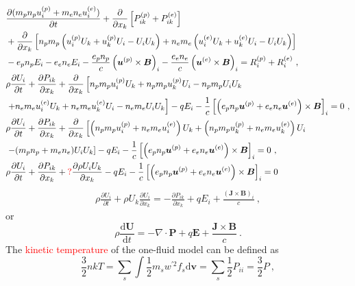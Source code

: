 \documentclass[12pt,a4paper]{article}
\renewcommand{\vec}[1]{\boldsymbol{#1}}
\newcommand{\dif}{\mathrm{d}}
\begin{document}
\begin{align*}
& \frac{\partial (m_p n_p u_i^{(p)} +m_e n_e u_i^{(e)})}{\partial t} +\frac{\partial }{\partial x_k} \left[P^{(p)}_{ik} +P^{(e)} _{ik} \right] \\
& +\frac{\partial }{\partial x_k} \left[n_p m_p \left(u_i^{(p)}U_k +u^{(p)}_{k} U_i -U_iU_k \right) +n_e m_e \left(u_i^{(e)}U_k +u^{(e)}_{k} U_i -U_iU_k \right) \right] \\
& -e_p n_p E_i -e_e n_e E_i -\frac{e_p n_p}{c} \left(\vec{u}^{(p)} \times \vec{B} \right)_i -\frac{e_e n_e}{c} \left(\vec{u}^{(e)} \times \vec{B} \right)_i  = R^{(p)}_i +R^{(e)}_i ~, \\
& \rho\frac{\partial U_i}{\partial t} +\frac{\partial P_{ik} }{\partial x_k} +\frac{\partial }{\partial x_k} \left[n_p m_p u_i^{(p)}U_k +n_p m_p  u^{(p)}_{k} U_i -n_p m_p  U_iU_k \right. \\ 
& \left. +n_e m_e u_i^{(e)}U_k +n_e m_e u^{(e)}_{k} U_i -n_e m_e U_iU_k \right] -q E_i -\frac{1}{c} \left[ \left(e_p n_p \vec{u}^{(p)} +e_e n_e \vec{u}^{(e)} \right)  \times \vec{B} \right]_i  = 0 ~,\\
& \rho\frac{\partial U_i}{\partial t} +\frac{\partial P_{ik} }{\partial x_k} +\frac{\partial }{\partial x_k} \left[\left(n_p m_p u_i^{(p)} +n_e m_e u_i^{(e)} \right) U_k +\left(n_p m_p u_k^{(p)} +n_e m_e u_k^{(e)} \right) U_i \right. \\ 
& \left. -(m_pn_p +m_en_e) U_i U_k\right] -q E_i -\frac{1}{c} \left[ \left(e_p n_p \vec{u}^{(p)} +e_e n_e \vec{u}^{(e)} \right)  \times \vec{B} \right]_i  = 0 ~,\\
& \rho\frac{\partial U_i}{\partial t} +\frac{\partial P_{ik} }{\partial x_k} +\textcolor{red}{?} \frac{\partial \rho U_i U_k }{\partial x_k} -q E_i -\frac{1}{c} \left[ \left(e_p n_p \vec{u}^{(p)} +e_e n_e \vec{u}^{(e)} \right)  \times \vec{B} \right]_i  = 0 
\end{align*}
\begin{align}
\rho\frac{\partial U_i}{\partial t} +\rho U_k\frac{\partial U_i}{\partial x_k} = -\frac{\partial P_{ik} }{\partial x_k} +qE_i +\frac{(\vec{J}\times \vec{B})_i}{c} ~,
\label{one_euler}
\end{align}
or
\begin{equation}
\rho\frac{\dif \vec{U}}{\dif t} = -\nabla \cdot \vec{P} +q \vec{E} +\frac{\vec{J}\times \vec{B}}{c} ~.
\end{equation}
The \textcolor{red}{kinetic temperature} of the one-fluid model can be defined as
\begin{equation*}
\frac{3}{2} nkT = \sum_s \int \frac{1}{2} m_s w^{\prime 2} f_s \dif \vec{v} = \sum_s \frac{1}{2} P_{ii} = \frac{3}{2} P ~,
\end{equation*}
\end{document}
